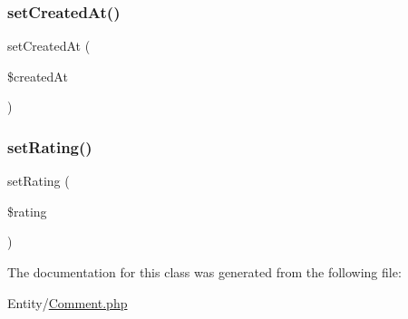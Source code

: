 \subsubsection{\texorpdfstring{setCreatedAt()}{setCreatedAt()}}
{\footnotesize\ttfamily set\+Created\+At (\begin{DoxyParamCaption}\item[{\textbackslash{}Date\+Time\+Interface}]{\$created\+At }\end{DoxyParamCaption})}

\mbox{\label{class_app_1_1_entity_1_1_comment_a46693f71b3a6b1cf691b65ba1e3e26a4}} 
\subsubsection{\texorpdfstring{setRating()}{setRating()}}
{\footnotesize\ttfamily set\+Rating (\begin{DoxyParamCaption}\item[{int}]{\$rating }\end{DoxyParamCaption})}



The documentation for this class was generated from the following file\+:\begin{DoxyCompactItemize}
\item 
Entity/\mbox{\hyperlink{_comment_8php}{Comment.\+php}}\end{DoxyCompactItemize}

